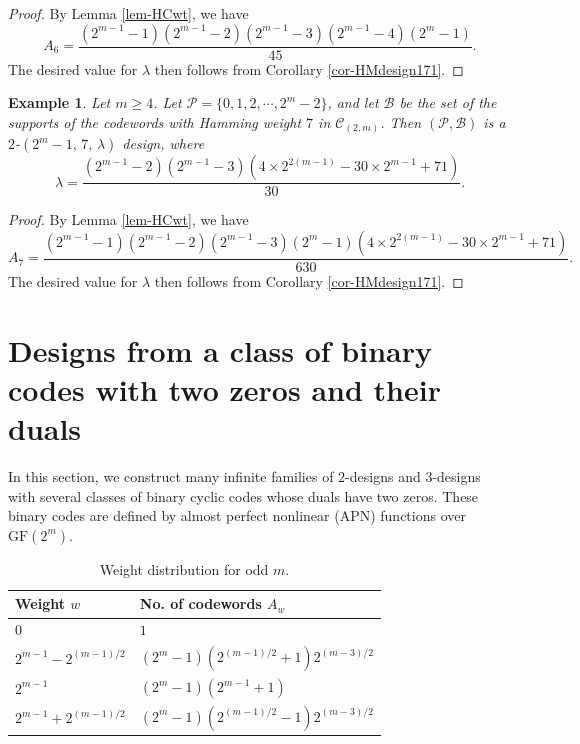 \documentclass[1p,final]{elsarticle}
\newtheorem{example}{Example}
\newcommand{\gf}{{\mathrm{GF}}}
\newcommand{\cP}{{\mathcal{P}}}
\newcommand{\cB}{{\mathcal{B}}}
\newcommand{\C}{{\mathcal{C}}}
\begin{document}
\begin{proof}
By Lemma \ref{lem-HCwt}, we have 
$$ 
A_6=\frac{(2^{m-1}-1)(2^{m-1}-2)(2^{m-1}-3)(2^{m-1}-4)(2^m-1)}{45}. 
$$
The desired value for $\lambda$ then follows from Corollary \ref{cor-HMdesign171}. 
\end{proof}


\begin{example}\label{exam-hmdesign7}  
Let $m \geq 4$. Let $\cP=\{0,1,2, \cdots, 2^m-2\}$, and let $\cB$ be  the set of the supports 
of the codewords with Hamming weight $7$ in $\C_{(2,m)}$.  
Then $(\cP, \cB)$ is a $2$-$(2^m-1, \, 7, \, \lambda)$ design, where 
$$ 
\lambda=\frac{(2^{m-1}-2)(2^{m-1}-3)(4 \times 2^{2(m-1)}-30 \times 2^{m-1} +71)}{30}.   
$$  
\end{example} 

\begin{proof}
By Lemma \ref{lem-HCwt}, we have 
$$ 
A_7=\frac{(2^{m-1}-1)(2^{m-1}-2)(2^{m-1}-3)(2^m-1)(4 \times 2^{2(m-1)}-30 \times 2^{m-1} +71)}{630}. 
$$
The desired value for $\lambda$ then follows from Corollary \ref{cor-HMdesign171}. 
\end{proof}



\section{Designs from a class of binary codes with two zeros and their duals}\label{sec-newdesigns}

In this section, we construct many infinite families of $2$-designs and $3$-designs with 
several classes of binary cyclic codes whose duals have two zeros. These binary codes are 
defined by almost perfect nonlinear (APN) functions over $\gf(2^m)$. 

\begin{table}[ht]
\caption{Weight distribution for odd $m$.}\label{tab-CG1}
\centering
\begin{tabular}{ll}
\hline
Weight $w$    & No. of codewords $A_w$  \\ \hline
$0$                                                        & $1$ \\
$2^{m-1}-2^{(m-1)/2}$           & $(2^m-1)(2^{(m-1)/2}+1)2^{(m-3)/2}$ \\
$2^{m-1}$                             & $(2^m-1)(2^{m-1}+1)$ \\
$2^{m-1}+2^{(m-1)/2}$           & $(2^m-1)(2^{(m-1)/2}-1)2^{(m-3)/2}$ \\ \hline
\end{tabular}
\end{table}
\end{document}
